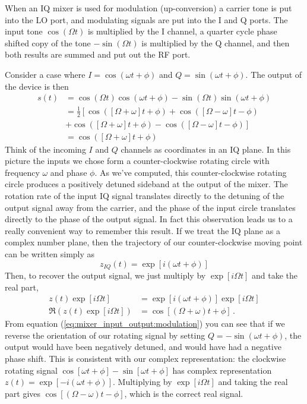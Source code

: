

When an IQ mixer is used for modulation (up-conversion) a carrier tone is put into the LO port, and modulating signals are put into the I and Q ports. The input tone $\cos ( \Omega t)$ is multiplied by the I channel, a quarter cycle phase shifted copy of the tone $-\sin ( \Omega t)$ is multiplied by the Q channel, and then both results are summed and put out the RF port.

Consider a case where $I=\cos(\omega t + \phi)$ and $Q=\sin(\omega t + \phi)$. The output of the device is then
\begin{align}
s(t) &= \cos(\Omega t)\cos(\omega t + \phi) - \sin(\Omega t)\sin(\omega t + \phi) \nonumber \\
&= \frac{1}{2} \left[ \cos([\Omega + \omega]t + \phi) + \cos([\Omega-\omega]t - \phi) \right. \nonumber \\
&  \left. + \cos([\Omega+\omega]t + \phi) - \cos([\Omega-\omega]t-\phi) \right] \label{eq:mixer_input_output:modulation} \\
&= \cos([\Omega+\omega]t + \phi) \nonumber
\end{align}
Think of the incoming $I$ and $Q$ channels as coordinates in an IQ plane.
In this picture the inputs we chose form a counter-clockwise rotating circle with frequency $\omega$ and phase $\phi$.
As we've computed, this counter-clockwise rotating circle produces a positively detuned sideband at the output of the mixer.
The rotation rate of the input IQ signal translates directly to the detuning of the output signal away from the carrier, and the phase of the input circle translates directly to the phase of the output signal.
In fact this observation leads us to a really convenient way to remember this result.
If we treat the IQ plane as a complex number plane, then the trajectory of our counter-clockwise moving point can be written simply as \begin{equation}
z_{IQ}(t) = \exp[i(\omega t + \phi)] \label{eq:mixer_input_output:modulation_complex_rep} \end{equation}
Then, to recover the output signal, we just multiply by $\exp[i\Omega t]$ and take the real part,
\begin{align}
z(t)\exp[i\Omega t] &= \exp[i(\omega t + \phi)]\exp[i\Omega t] \nonumber \\
\Re \left( z(t)\exp[i\Omega t] \right ) &= \cos[(\Omega+\omega)t+\phi] \nonumber \, .
\end{align}
From equation (\ref{eq:mixer_input_output:modulation}) you can see that if we reverse the orientation of our rotating signal by setting $Q=-\sin(\omega t + \phi)$, the output would have been negatively detuned, and would have had a negative phase shift.
This is consistent with our complex representation: the clockwise rotating signal $\cos[\omega t + \phi] - \sin[\omega t + \phi]$ has complex representation $z(t) = \exp[-i(\omega t + \phi)]$.
Multiplying by $\exp[i\Omega t]$ and taking the real part gives $\cos[(\Omega-\omega)t - \phi]$, which is the correct real signal.

